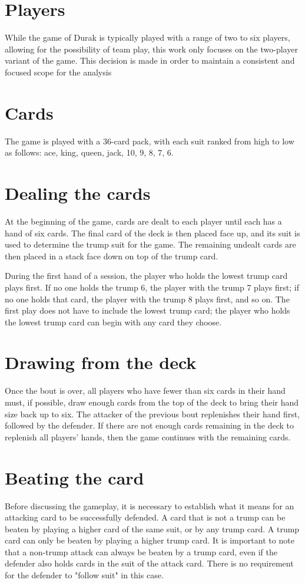 \section{Players}
While the game of Durak is typically played with a range of two to six players, allowing for the possibility of team play, this work only focuses on the two-player variant of the game. This decision is made in order to maintain a consistent and focused scope for the analysis

\section{Cards}
The game is played with a 36-card pack, with each suit ranked from high to low as follows: ace, king, queen, jack, 10, 9, 8, 7, 6.

\section{Dealing the cards}
At the beginning of the game, cards are dealt to each player until each has a hand of six cards. The final card of the deck is then placed face up, and its suit is used to determine the trump suit for the game. The remaining undealt cards are then placed in a stack face down on top of the trump card.

During the first hand of a session, the player who holds the lowest trump card plays first. If no one holds the trump 6, the player with the trump 7 plays first; if no one holds that card, the player with the trump 8 plays first, and so on. The first play does not have to include the lowest trump card; the player who holds the lowest trump card can begin with any card they choose.

\section{Drawing from the deck}
Once the bout is over, all players who have fewer than six cards in their hand must, if possible, draw enough cards from the top of the deck to bring their hand size back up to six. The attacker of the previous bout replenishes their hand first, followed by the defender. If there are not enough cards remaining in the deck to replenish all players' hands, then the game continues with the remaining cards.

\section{Beating the card}
Before discussing the gameplay, it is necessary to establish what it means for an attacking card to be successfully defended. A card that is not a trump can be beaten by playing a higher card of the same suit, or by any trump card. A trump card can only be beaten by playing a higher trump card. It is important to note that a non-trump attack can always be beaten by a trump card, even if the defender also holds cards in the suit of the attack card. There is no requirement for the defender to "follow suit" in this case.

